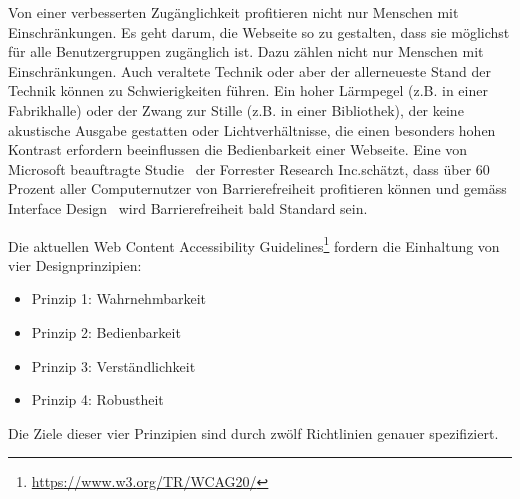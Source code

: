 Von einer verbesserten Zugänglichkeit profitieren nicht nur Menschen mit Einschränkungen. Es geht darum, die Webseite so zu gestalten, dass sie möglichst für alle Benutzergruppen zugänglich ist. Dazu zählen nicht nur Menschen mit Einschränkungen. Auch veraltete Technik oder aber der allerneueste Stand der Technik können zu Schwierigkeiten führen. Ein hoher Lärmpegel (z.B. in einer Fabrikhalle) oder der Zwang zur Stille (z.B. in einer Bibliothek), der keine akustische Ausgabe gestatten oder Lichtverhältnisse, die einen besonders hohen Kontrast erfordern beeinflussen die Bedienbarkeit einer Webseite. Eine von Microsoft beauftragte Studie~\cite{ForresterResearch2004E:Abilities} der \flqq Forrester Research Inc.\frqq schätzt, dass über 60 Prozent aller Computernutzer von Barrierefreiheit profitieren können und gemäss \flqq Interface Design\frqq ~\cite{ThesmannStephan2016ID:U} wird Barrierefreiheit bald Standard sein.

Die aktuellen Web Content Accessibility Guidelines\footnote{ \url{https://www.w3.org/TR/WCAG20/}} fordern die Einhaltung von vier Designprinzipien:

\begin{itemize}
\item Prinzip 1: Wahrnehmbarkeit
\item Prinzip 2: Bedienbarkeit
\item Prinzip 3: Verständlichkeit
\item Prinzip 4: Robustheit
\end{itemize}

Die Ziele dieser vier Prinzipien sind durch zwölf Richtlinien genauer spezifiziert.






